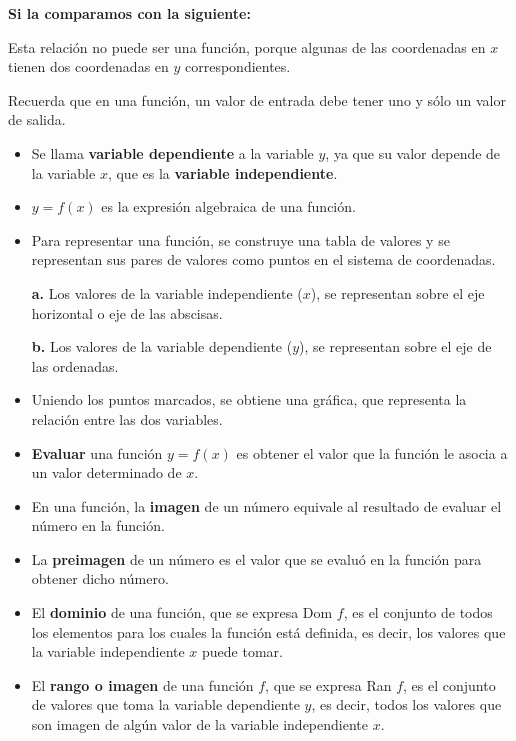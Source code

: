 \documentclass[12pt,a4paper]{article}
\begin{document}
\begin{tcolorbox}[colback=fondorosa,colframe=rojoclaro,breakable]

\textbf{Si la comparamos con la siguiente:}

Esta relación no puede ser una función, porque algunas de las coordenadas en $x$ tienen dos coordenadas en $y$ correspondientes.

Recuerda que en una función, un valor de entrada debe tener uno y sólo un valor de salida.

\begin{itemize}
\item Se llama \textbf{variable dependiente} a la variable $y$, ya que su valor depende de la variable $x$, que es la \textbf{variable independiente}.
\item $y = f(x)$ es la expresión algebraica de una función.
\item Para representar una función, se construye una tabla de valores y se representan sus pares de valores como puntos en el sistema de coordenadas.

\textbf{a.} Los valores de la variable independiente ($x$), se representan sobre el eje horizontal o eje de las abscisas.

\textbf{b.} Los valores de la variable dependiente ($y$), se representan sobre el eje de las ordenadas.

\item Uniendo los puntos marcados, se obtiene una gráfica, que representa la relación entre las dos variables.
\item \textbf{Evaluar} una función $y = f(x)$ es obtener el valor que la función le asocia a un valor determinado de $x$.
\item En una función, la \textbf{imagen} de un número equivale al resultado de evaluar el número en la función.
\item La \textbf{preimagen} de un número es el valor que se evaluó en la función para obtener dicho número.
\item El \textbf{dominio} de una función, que se expresa Dom $f$, es el conjunto de todos los elementos para los cuales la función está definida, es decir, los valores que la variable independiente $x$ puede tomar.
\item El \textbf{rango o imagen} de una función $f$, que se expresa Ran $f$, es el conjunto de valores que toma la variable dependiente $y$, es decir, todos los valores que son imagen de algún valor de la variable independiente $x$.
\end{itemize}


\end{tcolorbox}
\end{document}
